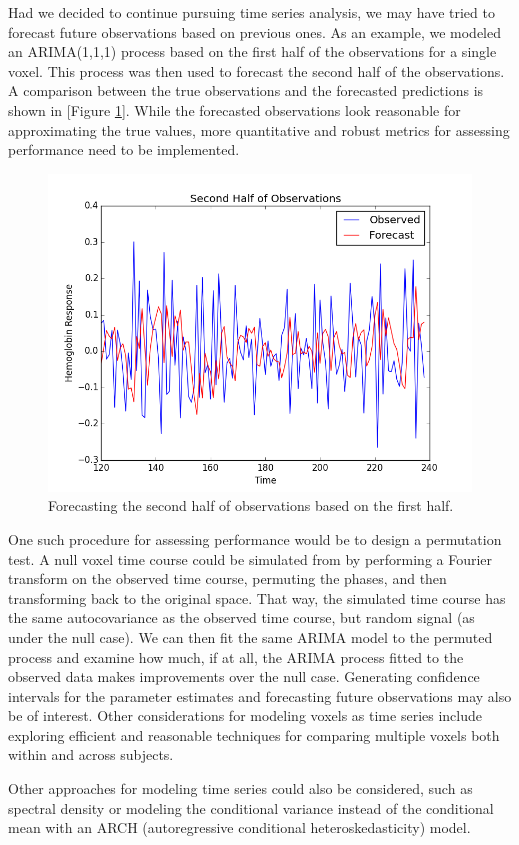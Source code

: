 \documentclass[11pt]{article}
\begin{document}
\par Had we decided to continue pursuing time series analysis, we may have 
tried to forecast future observations based on previous ones. As an example, 
we modeled an ARIMA(1,1,1) process based on the first half of the 
observations for a single voxel. This process was then used to forecast the 
second half of the observations. A comparison between the true observations 
and the forecasted predictions is shown in [Figure \ref{fig:ts-preds}]. 
While the forecasted observations look reasonable for approximating the true 
values, more quantitative and robust metrics for assessing performance need 
to be implemented. 

\begin{figure}[ht]
\centering
\includegraphics[scale=0.5]{images/ts-preds.png}
\caption{Forecasting the second half of observations based on the first 
half.}
\label{fig:ts-preds}
\end{figure}

\par One such procedure for assessing performance would be to design a 
permutation test. A null voxel time course could be simulated from by 
performing a Fourier transform on the observed time course, permuting the 
phases, and then transforming back to the original space. That way, the 
simulated time course has the same autocovariance as the observed time 
course, but random signal (as under the null case). We can then fit the 
same ARIMA model to the permuted process and examine how much, if at all, 
the ARIMA process fitted to the observed data makes improvements over the 
null case. Generating confidence intervals for the parameter estimates and 
forecasting future observations may also be of interest. Other considerations 
for modeling voxels as time series include exploring efficient and 
reasonable techniques for comparing multiple voxels both within and across 
subjects. 

\par Other approaches for modeling time series could also be considered, 
such as spectral density or modeling the conditional variance instead of the 
conditional mean with an ARCH (autoregressive conditional 
heteroskedasticity) model. 


\end{document}

